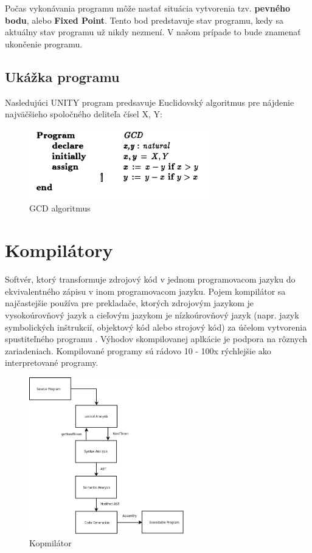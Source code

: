 Počas vykonávania programu môže nastať situácia vytvorenia tzv. \textbf{pevného bodu}, 
alebo \textbf{Fixed Point}. Tento bod predstavuje stav programu, kedy sa aktuálny stav programu
už nikdy nezmení. V našom prípade to bude znamenať ukončenie programu.


\subsection{Ukážka programu}
Nasledujúci UNITY program predsavuje Euclidovský algoritmus pre nájdenie najväčšieho spoločného deliteľa čísel X, Y:
\begin{figure}[h]
\centerline{\includegraphics[width=0.7\textwidth]{images/screen2}}
\caption[GCD algoritmus]{GCD algoritmus}
\label{obr:gcd}
\end{figure}

\section{Kompilátory}
Softvér, ktorý transformuje zdrojový kód v jednom programovacom jazyku do ekvivalentného zápisu v inom
programovacom jazyku. Pojem kompilátor sa najčastejšie používa pre prekladače, ktorých zdrojovým jazykom 
je vysokoúrovňový jazyk a cieľovým jazykom je nízkoúrovňový jazyk 
(napr. jazyk symbolických inštrukcií, objektový kód alebo strojový kód) 
za účelom vytvorenia spustiteľného programu \cite{br3}. Výhodov skompilovanej aplkácie je podpora 
na rôznych zariadeniach. Kompilované programy sú rádovo 10 - 100x rýchlejšie ako interpretované programy.

\begin{figure}[h]
\centerline{\includegraphics[width=0.6\textwidth]{images/multi-passcompiler}}
\caption[Kopmilátor]{Kopmilátor}
\label{obr:kompilator}
\end{figure}


